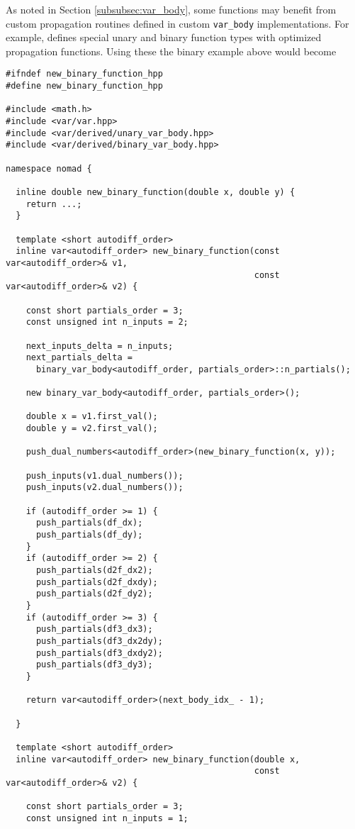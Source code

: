 As noted in Section \ref{subsubsec:var_body}, some functions may benefit
from custom propagation routines defined in custom \verb|var_body|
implementations.  For example, \nomad defines special unary and binary
function types with optimized propagation functions.  Using these the binary
example above would become
%
\begin{verbatim}
#ifndef new_binary_function_hpp
#define new_binary_function_hpp

#include <math.h>
#include <var/var.hpp>
#include <var/derived/unary_var_body.hpp>
#include <var/derived/binary_var_body.hpp>

namespace nomad {
  
  inline double new_binary_function(double x, double y) {
    return ...;
  }
  
  template <short autodiff_order>
  inline var<autodiff_order> new_binary_function(const var<autodiff_order>& v1,
                                                 const var<autodiff_order>& v2) {
    
    const short partials_order = 3;
    const unsigned int n_inputs = 2;
    
    next_inputs_delta = n_inputs;
    next_partials_delta =
      binary_var_body<autodiff_order, partials_order>::n_partials();
    
    new binary_var_body<autodiff_order, partials_order>();

    double x = v1.first_val();
    double y = v2.first_val();
    
    push_dual_numbers<autodiff_order>(new_binary_function(x, y));
    
    push_inputs(v1.dual_numbers());
    push_inputs(v2.dual_numbers());

    if (autodiff_order >= 1) {
      push_partials(df_dx);
      push_partials(df_dy);
    }
    if (autodiff_order >= 2) {
      push_partials(d2f_dx2);
      push_partials(d2f_dxdy);
      push_partials(d2f_dy2);
    }
    if (autodiff_order >= 3) {
      push_partials(df3_dx3);
      push_partials(df3_dx2dy);
      push_partials(df3_dxdy2);
      push_partials(df3_dy3);
    }

    return var<autodiff_order>(next_body_idx_ - 1);
    
  }
  
  template <short autodiff_order>
  inline var<autodiff_order> new_binary_function(double x,
                                                 const var<autodiff_order>& v2) {
    
    const short partials_order = 3;
    const unsigned int n_inputs = 1;
    

\end{verbatim}
